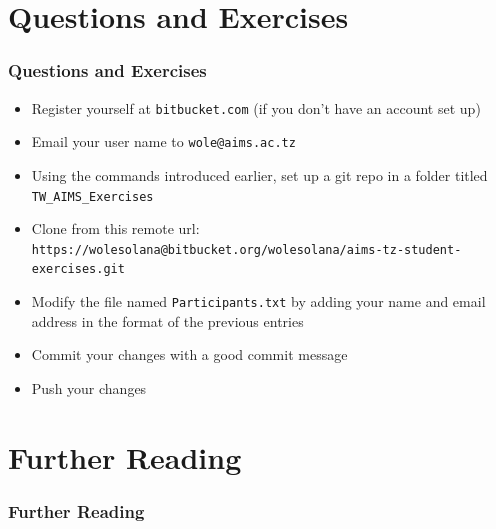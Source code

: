 \documentclass[10pt,t,sans,mathsans,xcolor=dvipsnames]{beamer}
\begin{document}
\section{Questions and Exercises}
\begin{frame}[fragile]
\frametitle{Questions and Exercises}
\pause
\begin{itemize}[<+->]
\item Register yourself at \texttt{bitbucket.com} (if you don't have an account set up)
\item Email your user name to \texttt{wole@aims.ac.tz}
\item Using the commands introduced earlier, set up a git repo in a folder titled \texttt{TW\_AIMS\_Exercises}
\item Clone from this remote url:\\
\footnotesize{\texttt{https://wolesolana@bitbucket.org/wolesolana/aims-tz-student-exercises.git}}
\item Modify the file named \texttt{Participants.txt} by adding your name and email address in the format of the previous entries
\item Commit your changes with a good commit message
\item Push your changes
\end{itemize}
\end{frame}
\section{Further Reading}
\begin{frame}
\frametitle{Further Reading}


\end{frame}
\end{document}
